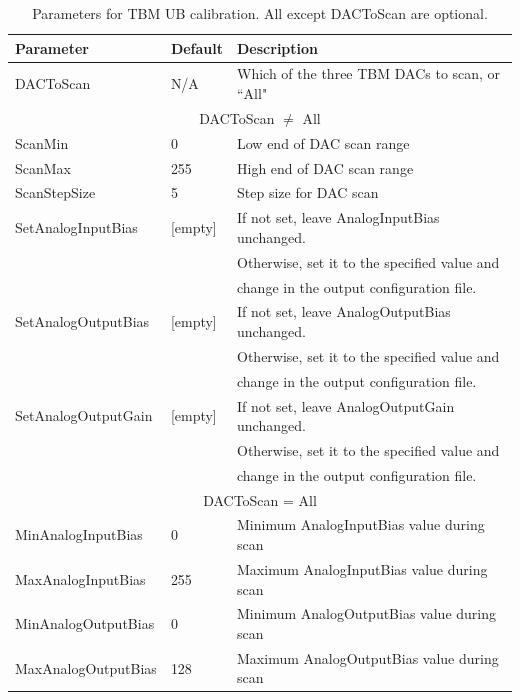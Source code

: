 \begin{table}
\centering
\caption{Parameters for TBM UB calibration.  All except DACToScan are optional.}
\label{tab:TBMUBParameters}
\begin{tabular}{l@{~~~~}l@{~~~~}l}
\hline
\hline
Parameter & Default & Description \\
\hline
DACToScan            & N/A                & Which of the three TBM DACs to scan, or ``All" \\
\hline
\multicolumn{3}{c}{DACToScan $\neq$ All} \\
ScanMin              & 0                  & Low end of DAC scan range \\
ScanMax              & 255                & High end of DAC scan range \\
ScanStepSize         & 5                  & Step size for DAC scan \\
SetAnalogInputBias   & [empty]            & If not set, leave AnalogInputBias unchanged. \\
                     &                    & Otherwise, set it to the specified value and\\
                     &                    & change in the output configuration file. \\
SetAnalogOutputBias  & [empty]            & If not set, leave AnalogOutputBias unchanged. \\
                     &                    & Otherwise, set it to the specified value and\\
                     &                    & change in the output configuration file. \\
SetAnalogOutputGain  & [empty]            & If not set, leave AnalogOutputGain unchanged. \\
                     &                    & Otherwise, set it to the specified value and\\
                     &                    & change in the output configuration file. \\
\hline
\multicolumn{3}{c}{DACToScan = All} \\
MinAnalogInputBias   & 0                  & Minimum AnalogInputBias value during scan \\
MaxAnalogInputBias   & 255                & Maximum AnalogInputBias value during scan \\
MinAnalogOutputBias  & 0                  & Minimum AnalogOutputBias value during scan \\
MaxAnalogOutputBias  & 128                & Maximum AnalogOutputBias value during scan \\

\end{tabular}
\end{table}
